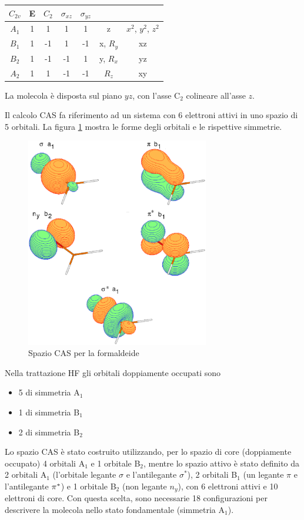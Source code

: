 \begin{center}
\begin{tabular}{c|cccc|c|c}
  $C_{2v}$  & E &  $C_2$ & $\sigma_{xz}$ & $\sigma_{yz}$ &  &  \\
\hline
    $A_1$  &   1 &   1 &   1 &   1 & z & $x^2$, $y^2$, $z^2$ \\
    $B_1$  &   1 &  -1 &   1 &  -1 & x, $R_y$ & xz \\
    $B_2$  &   1 &  -1 &  -1 &   1 & y, $R_x$ & yz \\
    $A_2$  &   1 &   1 &  -1 &  -1 & $R_z$ & xy \\
\end{tabular}
\end{center}

La molecola \`e disposta sul piano $yz$, con l'asse C$_2$ colineare all'asse $z$.

Il calcolo CAS fa riferimento ad un sistema con 6 elettroni attivi in uno
spazio di 5 orbitali. La figura \ref{fig:formaldeide_orbitali} mostra
le forme degli orbitali e le rispettive simmetrie.
\begin{figure}[htb]
\begin{center}
\includegraphics[width=8cm,keepaspectratio]{immagini/formaldeide/orbitali.eps}
\end{center}
\caption{Spazio CAS per la formaldeide}
\label{fig:formaldeide_orbitali}
\end{figure}

Nella trattazione HF gli orbitali doppiamente occupati sono
\begin{itemize}
\item 5 di simmetria A$_1$
\item 1 di simmetria B$_1$
\item 2 di simmetria B$_2$
\end{itemize}
Lo spazio CAS \`e stato costruito utilizzando, per lo spazio di core
(doppiamente occupato) 4 orbitali A$_1$ e 1 orbitale B$_2$,
mentre lo spazio attivo \`e stato definito da 2 orbitali A$_1$
(l'orbitale legante $\sigma$ e l'antilegante $\sigma^{*}$), 2 orbitali B$_1$
(un legante $\pi$ e l'antilegante $\pi^{*}$) e 1 orbitale B$_2$ (non legante 
$n_y$), con 6 elettroni attivi e 10 elettroni di core.
Con questa scelta, sono necessarie 18 configurazioni per descrivere la molecola
nello stato fondamentale (simmetria A$_1$). 

